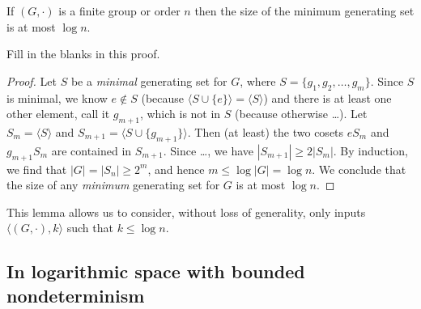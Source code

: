 \documentclass{article}
\newcommand{\gen}[1]{{\langle #1 \rangle}}
\begin{document}
\begin{lemma}\label{lem:log}
  If $(G, \cdot)$ is a finite group or order $n$ then the size of the minimum generating set is at most $\log n$.
\end{lemma}
\begin{todo}
  Fill in the blanks in this proof.
\end{todo}
\begin{proof}
  Let $S$ be a \emph{minimal} generating set for $G$, where $S = \{g_1, g_2, \dotsc, g_m\}$.
  Since $S$ is minimal, we know $e \notin S$ (because $\gen{S \cup \{e\}} = \gen{S}$) and there is at least one other element, call it $g_{m + 1}$, which is not in $S$ (because otherwise \ldots).
  Let $S_m = \gen{S}$ and $S_{m + 1} = \gen{S \cup \{g_{m + 1}\}}$.
  Then (at least) the two cosets $e S_m$ and $g_{m + 1} S_m$ are contained in $S_{m + 1}$.
  Since \ldots, we have $|S_{m + 1}| \geq 2 |S_m|$.
  By induction, we find that $|G| = |S_n| \geq 2^m$, and hence $m \leq \log |G| = \log n$.
  We conclude that the size of any \emph{minimum} generating set for $G$ is at most $\log n$.
\end{proof}

This lemma allows us to consider, without loss of generality, only inputs $\langle (G, \cdot), k \rangle$ such that $k \leq \log n$.

\subsection{In logarithmic space with bounded nondeterminism}
\end{document}
